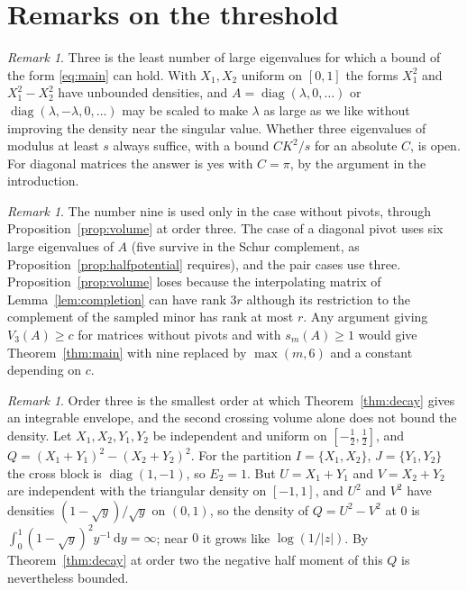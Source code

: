 \documentclass[11pt]{amsart}
\numberwithin{equation}{section}
\theoremstyle{definition}
\theoremstyle{remark}
\newtheorem{remark}[theorem]{Remark}
\newcommand{\1}{\mathbf 1}
\newcommand{\dd}{\,\mathrm d}
\DeclareMathOperator{\diag}{diag}
\newcommand{\abs}[1]{\lvert #1\rvert}
\begin{document}
\section{Remarks on the threshold}\label{sec:remarks}

\begin{remark}\label{rem:three}
Three is the least number of large eigenvalues for which a bound of the form \eqref{eq:main} can hold. With $X_1,X_2$ uniform on $[0,1]$ the forms $X_1^2$ and $X_1^2-X_2^2$ have unbounded densities, and $A=\diag(\lambda,0,\dots)$ or $\diag(\lambda,-\lambda,0,\dots)$ may be scaled to make $\lambda$ as large as we like without improving the density near the singular value. Whether three eigenvalues of modulus at least $s$ always suffice, with a bound $CK^2/s$ for an absolute $C$, is open. For diagonal matrices the answer is yes with $C=\pi$, by the argument in the introduction.
\end{remark}

\begin{remark}\label{rem:nine}
The number nine is used only in the case without pivots, through Proposition~\ref{prop:volume} at order three. The case of a diagonal pivot uses six large eigenvalues of $A$ (five survive in the Schur complement, as Proposition~\ref{prop:halfpotential} requires), and the pair cases use three. Proposition~\ref{prop:volume} loses because the interpolating matrix of Lemma~\ref{lem:completion} can have rank $3r$ although its restriction to the complement of the sampled minor has rank at most $r$. Any argument giving $V_3(A)\ge c$ for matrices without pivots and with $s_m(A)\ge1$ would give Theorem~\ref{thm:main} with nine replaced by $\max(m,6)$ and a constant depending on $c$.
\end{remark}

\begin{remark}
Order three is the smallest order at which Theorem~\ref{thm:decay} gives an integrable envelope, and the second crossing volume alone does not bound the density. Let $X_1,X_2,Y_1,Y_2$ be independent and uniform on $[-\frac12,\frac12]$, and $Q=(X_1+Y_1)^2-(X_2+Y_2)^2$. For the partition $I=\{X_1,X_2\}$, $J=\{Y_1,Y_2\}$ the cross block is $\diag(1,-1)$, so $E_2=1$. But $U=X_1+Y_1$ and $V=X_2+Y_2$ are independent with the triangular density on $[-1,1]$, and $U^2$ and $V^2$ have densities $(1-\sqrt y)/\sqrt y$ on $(0,1)$, so the density of $Q=U^2-V^2$ at $0$ is $\int_0^1(1-\sqrt y)^2y^{-1}\dd y=\infty$; near $0$ it grows like $\log(1/\abs z)$. By Theorem~\ref{thm:decay} at order two the negative half moment of this $Q$ is nevertheless bounded.
\end{remark}
\end{document}
